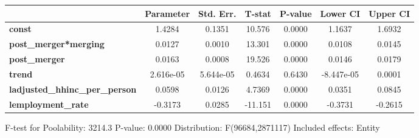 \documentclass{report}
\begin{document}
\begin{center}
\begin{tabular}{lclc}
\bottomrule
\end{tabular}
\begin{tabular}{lcccccc}
                                       & \textbf{Parameter} & \textbf{Std. Err.} & \textbf{T-stat} & \textbf{P-value} & \textbf{Lower CI} & \textbf{Upper CI}  \\
\midrule
\textbf{const}                         &       1.4284       &       0.1351       &      10.576     &      0.0000      &       1.1637      &       1.6932       \\
\textbf{post\_merger*merging}          &       0.0127       &       0.0010       &      13.301     &      0.0000      &       0.0108      &       0.0145       \\
\textbf{post\_merger}                  &       0.0163       &       0.0008       &      19.526     &      0.0000      &       0.0146      &       0.0179       \\
\textbf{trend}                         &     2.616e-05      &     5.644e-05      &      0.4634     &      0.6430      &     -8.447e-05    &       0.0001       \\
\textbf{ladjusted\_hhinc\_per\_person} &       0.0598       &       0.0126       &      4.7369     &      0.0000      &       0.0351      &       0.0845       \\
\textbf{lemployment\_rate}             &      -0.3173       &       0.0285       &     -11.151     &      0.0000      &      -0.3731      &      -0.2615       \\
\bottomrule
\end{tabular}
\end{center}

F-test for Poolability: 3214.3 \newline
 P-value: 0.0000 \newline
 Distribution: F(96684,2871117) \newline
  \newline
 Included effects: Entity
\end{document}
